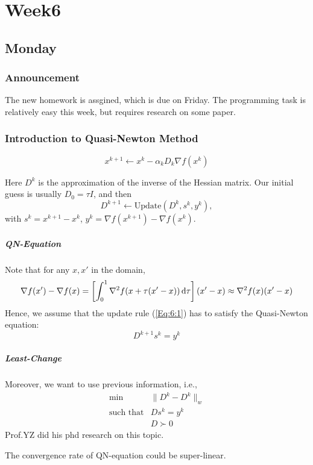 
\chapter{Week6}

\section{Monday}
\subsection{Announcement}
The new homework is assgined, which is due on Friday. The programming task is relatively easy this week, but requires research on some paper.
\subsection{Introduction to Quasi-Newton Method}
\[
x^{k+1} \leftarrow x^k -\alpha_k D_k\nabla f(x^k)
\]

Here $D^k$ is the approximation of the inverse of the Hessian matrix. Our initial guess is usually $D_0=\tau I$, and then
\begin{equation}\label{Eq:6:1}
D^{k+1} \leftarrow \mbox{Update}(D^k,s^k,y^k),
\end{equation}
with $s^k = x^{k+1} -  x^k$, $y^k = \nabla f(x^{k+1}) - \nabla f(x^k)$. 
\paragraph{QN-Equation} Note that for any $x,x'$ in the domain,
\[
\nabla f(x') - \nabla f(x)  = \left[\int_0^1\nabla^2f(x+\tau(x'-x))\,\mathrm{d}\tau\right](x'-x)\approx
\nabla^2f(x)(x'-x)
\]
Hence, we assume that the update rule (\ref{Eq:6:1}) has to satisfy the Quasi-Newton equation:
\[
D^{k+1}s^k = y^k
\]

\paragraph{Least-Change}
Moreover, we want to use previous information, i.e., 
\[\begin{array}{ll}
\min &\|D^{k}-D^k\|_{w}\\
\mbox{such that}&Ds^k=y^k\\
&D\succ0
\end{array}
\]
Prof.YZ did his phd research on this topic.

The convergence rate of QN-equation could be super-linear. 
